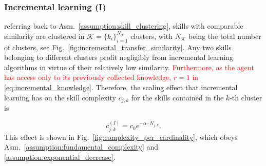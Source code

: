 \subsubsection{\textbf{Incremental learning (I)}}
referring back to Asm.~\ref{assumption:skill_clustering}, skills with comparable similarity are clustered in $\mathcal{K} = \lbrace k_i \rbrace^{N_\mathcal{K}}_{i=1} $ clusters, with $N_\mathcal{K}$ being the total number of clusters, see Fig.~\ref{fig:incremental_transfer_similarity}. Any two skills belonging to different clusters profit negligibly from incremental learning algorithms in virtue of their relatively low similarity. \textcolor{red}{Furthermore, as the agent has access only to its previously collected knowledge, $r = 1$ in \eqref{eq:incremental_knowledge}}. Therefore, the scaling effect that incremental learning has on the skill complexity $c_{j,k}$ for the skills contained in the $k$-th cluster is

\begin{equation}\label{eq:complexity_IL}
	c^{(I)}_{j,k} = c_0  e^{-\alpha \cdot {N_{j,k}}}.
\end{equation}
This effect is shown in Fig.~\ref{fig:complexity_per_cardinality}, which obeys Asm.~\ref{assumption:fundamental_complexity} and \ref{assumption:exponential_decrease}. %

